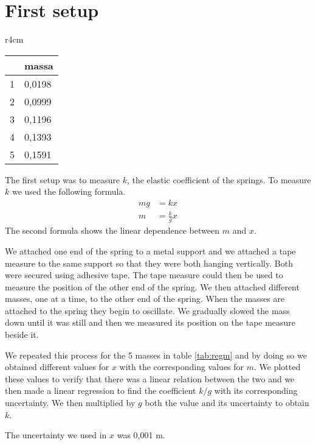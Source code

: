 \documentclass{article}
\begin{document}
\section{First setup} \label{sec:setup1}
\begin{wraptable}{r}{4cm}
    \centering
    \begin{tabular}{|l|l|}
    \hline
         & massa \\ \hline
        1 & 0,0198 \\ \hline
        2 & 0,0999 \\ \hline
        3 & 0,1196 \\ \hline
        4 & 0,1393 \\ \hline
        5 & 0,1591 \\ \hline
    \end{tabular}
    \caption{Masses used for calculating k}
    \label{tab:regm}
\end{wraptable}
The first setup was to measure $k$, the elastic coefficient of the springs. 
To measure $k$ we used the following formula.
\begin{align}
    mg &= kx \\
    m  &= \frac{k}{g}x
\end{align}
The second formula shows the linear dependence between $m$ and $x$.

We attached one end of the spring to a metal support and we attached a tape measure to the same support so that they were both hanging vertically. Both were secured using adhesive tape. The tape measure could then be used to measure the position of the other end of the spring. We then attached different masses, one at a time, to the other end of the spring. When the masses are attached to the spring they begin to oscillate. We gradually slowed the mass down until it was still and then we measured its position on the tape measure beside it. 

We repeated this process for the 5 masses in table \ref{tab:regm} and by doing so we obtained different values for $x$ with the
corresponding values for $m$. We plotted these values to verify that
there was a linear relation between the two and we then made a linear
regression to find the coefficient $k/g$ with its corresponding
uncertainty. We then multiplied by $g$ both the value and its uncertainty to obtain $k$. 

The uncertainty we used in $x$ was 0,001 m.
\end{document}
